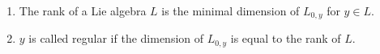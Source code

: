 \begin{enumerate}[label=(\roman*)]
	\item The rank of a Lie algebra $L$ is the minimal dimension of $L_{0, y}$ for
	$y \in L$.
\item $y$ is called regular if the dimension of  $L_{0,y}$ is equal to the
	rank of $L$.
\end{enumerate}
